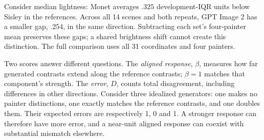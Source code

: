 Consider median lightness: Monet averages $.325$ development-IQR units below
Sisley in the references. Across all 14 scenes and both repeats, GPT Image 2
has a smaller gap, $.254$, in the same direction. Subtracting each set's
four-painter mean preserves these gaps; a shared brightness shift cannot create
this distinction. The full comparison uses all 31 coordinates and four painters.

Two scores answer different questions. The \emph{aligned response}, $\beta$,
measures how far generated contrasts extend along the reference contrasts;
$\beta=1$ matches that component's strength. The \emph{error}, $D$, counts total
disagreement, including differences in other directions. Consider three idealized
generators: one makes no painter distinctions, one exactly matches the reference
contrasts, and one doubles them. Their expected errors are respectively 1, 0
and 1. A stronger response can therefore have more error, and a near-unit
aligned response can coexist with substantial mismatch elsewhere.

